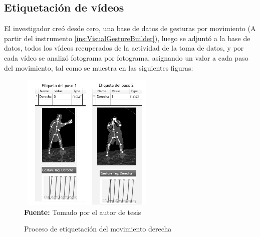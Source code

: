 \subsection{Etiquetaci\'on de v\'ideos}
El investigador cre\'o desde cero, una base de datos de gesturas por movimiento (A partir del instrumento \ref{ins:VisualGestureBuilder}), luego se adjunt\'o a la base de datos, todos los v\'ideos recuperados de la actividad de la toma de datos, y por cada v\'ideo se analiz\'o fotograma por fotograma, asignando un valor a cada paso del movimiento, tal como se muestra en las siguientes figuras:
 \begin{figure}[H]
	\caption{Proceso de etiquetaci\'on del movimiento derecha}
	\label{fig:getTag}
	\centering
	\includegraphics[width=250px,height=250px]{graphics/etiquetas.png} \\
	\textbf{Fuente:} Tomado por el autor de tesis
\end{figure} 
